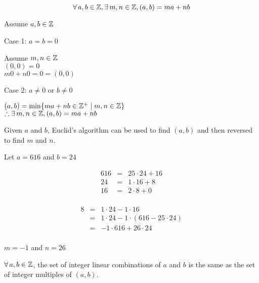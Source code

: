 \documentclass[letterpaper,12pt,fleqn]{article}
\begin{document}
\begin{corollary}
  \listbreak
  \[\forall\,a,b\in\mathbb{Z},\exists\,m,n\in\mathbb{Z},(a,b)=ma+nb\]
\end{corollary}

\begin{theproof}
  Assume $a,b\in\mathbb{Z}$
  \begin{description}
  \item{Case 1: $a=b=0$}

    Assume $m,n\in\mathbb{Z}$ \\
    $(0,0)=0$ \\
    $m0+n0=0=(0,0)$

  \item{Case 2: $a\ne0$ or $b\ne0$}
    
    $(a,b)=\min\{ma+nb\in\mathbb{Z}^+\mid m,n\in\mathbb{Z}\}$ \\
    $\therefore \exists\,m,n\in\mathbb{Z},(a,b)=ma+nb$
  \end{description}
\end{theproof}

Given $a$ and $b$, Euclid's algorithm can be used to find $(a,b)$ and then
reversed to find $m$ and $n$.

\begin{example}
  Let $a=616$ and $b=24$

  \begin{minipage}[t]{3in}
    \begin{eqnarray*}
      616 &=& 25\cdot24+16 \\
      24 &=& 1\cdot16+8 \\
      16 &=& 2\cdot8+0 \\
    \end{eqnarray*}
  \end{minipage}
  \begin{minipage}[t]{3in}
    \begin{eqnarray*}
      8 &=& 1\cdot24-1\cdot16 \\
      &=& 1\cdot24-1\cdot(616-25\cdot24) \\
      &=& -1\cdot616+26\cdot24 \\
    \end{eqnarray*}
  \end{minipage}

  $m=-1$ and $n=26$
\end{example}

\begin{theorem}
  $\forall\,a,b\in\mathbb{Z}$, the set of integer linear combinations of $a$ and $b$ is
  the same as the set of integer multiples of $(a,b)$.
\end{theorem}
\end{document}
